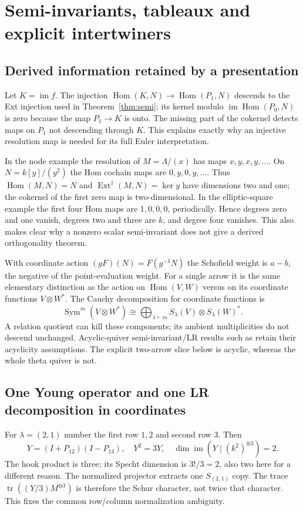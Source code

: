 \documentclass[11pt,oneside,openany]{book}
\theoremstyle{definition}\newtheorem{definition}[theorem]{Definition}
\theoremstyle{remark}\newtheorem{remark}[theorem]{Remark}
\DeclareMathOperator{\tr}{tr}\DeclareMathOperator{\Rea}{Re}
\begin{document}
\chapter{Semi-invariants, tableaux and explicit intertwiners}
\section{Derived information retained by a presentation}
Let $K=\operatorname{im}f$. The injection $\operatorname{Hom}(K,N)\to\operatorname{Hom}(P_1,N)$ descends to the Ext injection used in Theorem~\ref{thm:semi}; its kernel modulo $\operatorname{im}\operatorname{Hom}(P_0,N)$ is zero because the map $P_1\to K$ is onto. The missing part of the cokernel detects maps on $P_1$ not descending through $K$. This explains exactly why an injective resolution map is needed for its full Euler interpretation.

In the node example the resolution of $M=\Lambda/(x)$ has maps $x,y,x,y,\ldots$. On $N=k[y]/(y^2)$ the Hom cochain maps are $0,y,0,y,\ldots$. Thus $\operatorname{Hom}(M,N)=N$ and $\operatorname{Ext}^1(M,N)=\ker y$ have dimensions two and one; the cokernel of the first zero map is two-dimensional. In the elliptic-square example the first four Hom maps are $1,0,0,0$, periodically. Hence degrees zero and one vanish, degrees two and three are $k$, and degree four vanishes. This also makes clear why a nonzero scalar semi-invariant does not give a derived orthogonality theorem.

With coordinate action $(gF)(N)=F(g^{-1}N)$ the Schofield weight is $a-b$, the negative of the point-evaluation weight. For a single arrow it is the same elementary distinction as the action on $\operatorname{Hom}(V,W)$ versus on its coordinate functions $V\otimes W^*$. The Cauchy decomposition for coordinate functions is
\[
 \operatorname{Sym}^m(V\otimes W^*)\cong
 \bigoplus_{\lambda\vdash m}S_\lambda(V)\otimes S_\lambda(W)^*.
\]
A relation quotient can kill these components; its ambient multiplicities do not descend unchanged. Acyclic-quiver semi-invariant/LR results such as \cite{DerksenWeyman} retain their acyclicity assumptions. The explicit two-arrow slice below is acyclic, whereas the whole theta quiver is not.

\section{One Young operator and one LR decomposition in coordinates}
For $\lambda=(2,1)$ number the first row $1,2$ and second row $3$. Then
\[
 Y=(I+P_{12})(I-P_{13}),\quad Y^2=3Y,\quad
 \dim\operatorname{im}(Y\mid(k^2)^{\otimes3})=2.
\]
The hook product is three; its Specht dimension is $3!/3=2$, also two here for a different reason. The normalized projector extracts one $S_{(2,1)}$ copy. The trace $\tr((Y/3)M^{\otimes3})$ is therefore the Schur character, not twice that character. This fixes the common row/column normalization ambiguity.
\end{document}
